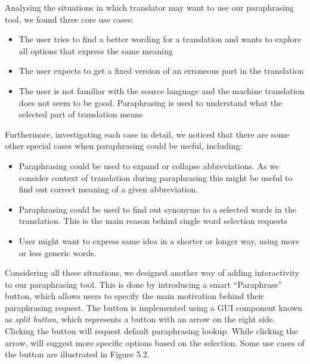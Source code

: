 Analysing the situations in which translator may want to use our paraphrasing tool, we found three core use cases:

\begin{itemize}
    \item The user tries to find a better wording for a translation and wants to explore all options that express the same meaning
    \item The user expects to get a fixed version of an erroneous part in the translation
    \item The user is not familiar with the source language and the machine translation does not seem to be good. Paraphrasing is used to understand what the selected part of translation means  
\end{itemize}

Furthermore, investigating each case in detail, we noticed that there are some other special cases when paraphrasing could be useful, including:

\begin{itemize}
    \item Paraphrasing could be used to expand or collapse abbreviations. As we consider context of translation during paraphrasing this might be useful to find out correct meaning of a given abbreviation.

    \item Paraphrasing could be used to find out synonyms to a selected words in the translation. This is the main reason behind single word selection requests

    \item User might want to express same idea in a shorter or longer way, using more or less generic words. 
\end{itemize}

Considering all these situations, we designed another way of adding interactivity to our paraphrasing tool. This is done by introducing a smart ``Paraphrase'' button, which allows users to specify the main motivation behind their paraphrasing request. The button is implemented using a GUI component known as \emph{split button}, which represents a button with an arrow on the right side. Clicking the button will request default paraphrasing lookup. While clicking the arrow, will suggest more specific options based on the selection. Some use cases of the button are illustrated in Figure 5.2.   

